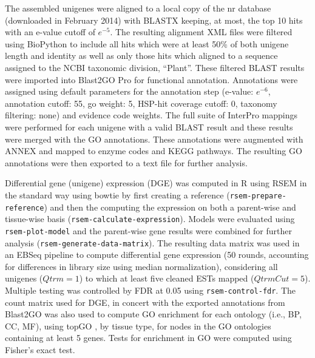 \documentclass[11pt]{article}
\begin{document}
The assembled unigenes were aligned to a local copy of the nr database
(downloaded in February 2014) with BLASTX \citep{citeulike:238188}
keeping, at most, the top 10 hits with an e-value cutoff of
$e^{-5}$. The resulting alignment XML files were filtered using
BioPython \citep[v.\ 1.6.4]{citeulike:4202607} to include all hits
which were at least 50\% of both unigene length and identity as well 
as only those hits which aligned to a sequence assigned to the 
NCBI taxonomic division, ``Plant''. These
filtered BLAST results were imported into Blast2GO Pro \citep[v.\
2.7.2, bg2\_may14]{citeulike:2733895} for functional annotation.
Annotations were assigned using default parameters for the annotation
step (e-value: $e^{-6}$, annotation cutoff: 55, go weight: 5, HSP-hit
coverage cutoff: 0, taxonomy filtering: none) and evidence code
weights. The full suite of InterPro \citep{citeulike:12942060}
mappings were performed for each unigene with a valid BLAST result and
these results were merged with the GO annotations.  These annotations
were augmented with ANNEX \citep{annex} and mapped to enzyme codes and
KEGG \citep{citeulike:9172127} pathways. The resulting GO annotations 
were then exported to a text file for further analysis.

Differential gene (unigene) expression (DGE) was computed in R
\citep[v. 3.1.1]{R} using RSEM
\citep[v. 1.2.15]{Li:BmcBioinformatics:2011} in the standard way using
bowtie \citep[v. 2.2.3]{Langmead:NatMethods:2012} by first creating a
reference (\texttt{rsem-prepare-reference}) and then the computing the
expression on both a parent-wise and tissue-wise basis
(\texttt{rsem-calculate-expression}). Models were evaluated using
\texttt{rsem-plot-model} and the parent-wise gene results were
combined for further analysis
(\texttt{rsem-generate-data-matrix}). The resulting data matrix was
used in an EBSeq \citep{Leng:Bioinformatics:2013} pipeline to compute
differential gene expression (50 rounds, accounting for differences in
library size using median normalization), considering all unigenes
($Qtrm=1$) to which at least five cleaned ESTs mapped
($QtrmCut=5$). Multiple testing was controlled by FDR
\citep{benjamini1995controlling} at 0.05 using
\texttt{rsem-control-fdr}.  The count matrix used for DGE, in concert
with the exported annotations from Blast2GO was also used to compute
GO enrichment for each ontology (i.e., BP, CC, MF), using topGO
\citep{topgo}, by tissue type, for nodes in the GO ontologies containing 
at least 5 genes.  Tests for enrichment in GO were computed using 
Fisher's exact test.
\end{document}
